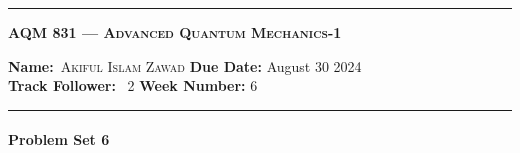 \allowdisplaybreaks
\begin{center}
	\hrule
	\vspace{.4cm}
	\Large\scshape\textbf{AQM 831 --- Advanced Quantum Mechanics-1}
\end{center}
{\textbf{Name:}\ \textsc{Akiful Islam Zawad} \hspace{\hfill} \textbf{Due Date:} August 30 2024\\[5pt]
{ \textbf{Track Follower:}} \ 2 \hspace{\hfill} \textbf{Week Number:} 6 \\
	\hrule}
\paragraph*{Problem Set 6} %
\\
